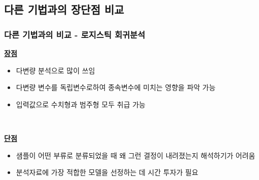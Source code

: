 \documentclass{beamer}
\begin{document}
\subsection{다른 기법과의 장단점 비교}

\begin{frame}
\frametitle{다른 기법과의 비교 - \textcolor[rgb]{1.00,0.50,0.25}{로지스틱 회귀분석}}
{\scriptsize{}

	\underline{\textbf{장점}}

	\begin{itemize}

		\item 다변량 분석으로 많이 쓰임

		\item 다변량 변수를 독립변수로하여 종속변수에 미치는 영향을 파악 가능

		\item 입력값으로 수치형과 범주형 모두 취급 가능
		
	\end{itemize}

	{}\


	\underline{\textbf{단점}}

	\begin{itemize}

		\item 샘플이 어떤 부류로 분류되었을 때 왜 그런 결정이 내려졌는지 해석하기가 어려움

		\item 분석자료에 가장 적합한 모델을 선정하는 데 시간 투자가 필요
		
	\end{itemize}
}
\end{frame}
\end{document}
